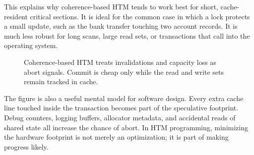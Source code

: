 This explains why coherence-based HTM tends to work best for short, cache-resident critical sections. It is ideal for the common case in which a lock protects a small update, such as the bank transfer touching two account records. It is much less robust for long scans, large read sets, or transactions that call into the operating system.

\begin{figure}[htbp]
\centering
{}
\caption{Coherence-based HTM treats invalidations and capacity loss as abort signals. Commit is cheap only while the read and write sets remain tracked in cache.}
\label{fig:htm-coherence-abort}
\end{figure}

The figure is also a useful mental model for software design. Every extra cache line touched inside the transaction becomes part of the speculative footprint. Debug counters, logging buffers, allocator metadata, and accidental reads of shared state all increase the chance of abort. In HTM programming, minimizing the hardware footprint is not merely an optimization; it is part of making progress likely.

